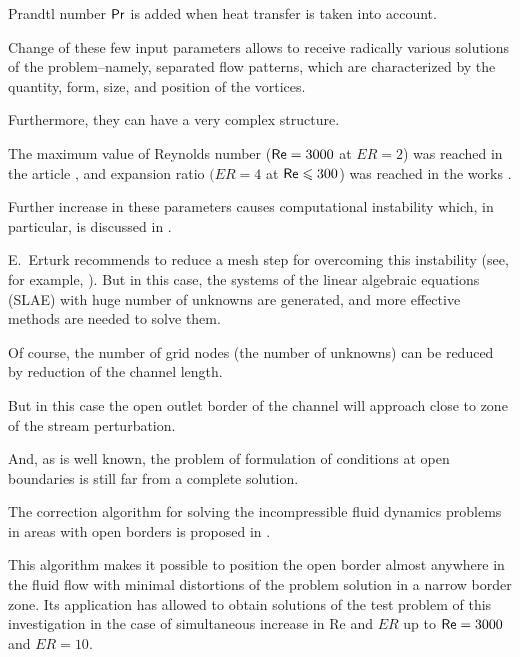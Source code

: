 Prandtl number ${\sf Pr}$ is added when heat transfer is taken into account. 

Change of these few input parameters allows to receive radically various solutions of the problem--namely, separated flow patterns, which are characterized by the quantity, form, size, and position of the vortices. 

Furthermore, they can have a very complex structure. 

The maximum value of Reynolds number (${\sf Re}=3000$ at $ER=2$) was reached in the article \cite{Erturk2008}, and expansion ratio $(ER=4$ at ${\sf Re} \leqslant 300$) was reached in the works \cite{Tihon,Valencia}.  



Further increase in these parameters causes computational instability which, in particular, is discussed in \cite{Erturk2008}. 

E.~Erturk recommends to reduce a mesh step for overcoming this instability (see, for example, \cite{Erturk2009}). But in this case, the systems of the linear algebraic equations (SLAE) with huge number of unknowns are generated, and more effective methods are needed to solve them. 

Of course, the number of grid nodes (the number of unknowns) can be reduced by reduction of the channel length. 

But in this case the open outlet border of the channel will approach close to zone of the stream perturbation. 

And, as is well known, the problem of formulation of conditions at open boundaries is still far from a complete solution.



The correction algorithm for solving the incompressible fluid dynamics prob\-lems in areas with open borders is proposed in \cite{Fomin2016}. 

This algorithm makes it possible to position the open border almost anywhere in the fluid flow with minimal distortions of the problem solution in a narrow border zone. Its application has allowed to obtain solutions of the test problem of this investigation in the case of simultaneous increase in {\sf Re} and $ER$ up to ${\sf Re}=3000$ and $ER=10$.



\smallskip






